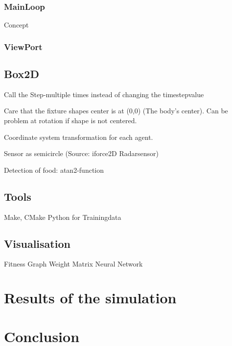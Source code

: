 \documentclass[10pt,a4paper,DIV=11]{scrreprt}
\begin{document}
\subsection{MainLoop}

Concept

\subsection{ViewPort}

\section{Box2D}

Call the Step-multiple times instead of changing the timestepvalue

Care that the fixture shapes center is at (0,0) (The body's center). Can be problem at rotation if shape is not centered.

Coordinate system transformation for each agent.

Sensor as semicircle (Source: iforce2D Radarsensor)

Detection of food: atan2-function

\section{Tools}
Make, CMake
Python for Trainingdata

\section{Visualisation}

Fitness Graph
Weight Matrix
Neural Network






\chapter{Results of the simulation}

\chapter{Conclusion}
\end{document}
